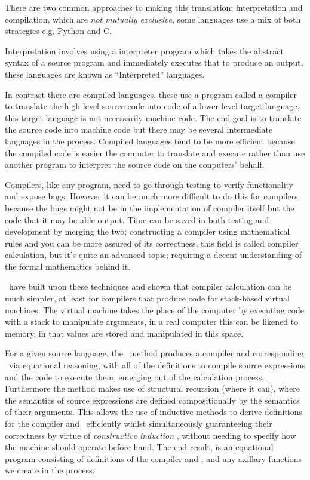 \documentclass {article}
\begin{document}
There are two common approaches to making this translation:
interpretation and compilation, which are \emph{not mutually exclusive}, some languages use a mix of both 
strategies e.g. Python and C.

Interpretation involves using a
interpreter program which takes the abstract syntax of a
source program and immediately executes that to produce an output,
these languages are known as ``Interpreted'' languages.

In contrast there are compiled languages, these use 
a program called a compiler to translate the high level
source code into code of a lower level target language,
this target language is not necessarily machine code.
The end goal is to translate the source code into machine code
but there may be several intermediate languages in the process\cite[pg 8-10]{compilers}. Compiled languages tend to be more efficient
because the compiled code is easier the computer to translate
and execute rather than use another program to interpret
the source code on the conputers' behalf.

Compilers, like any program, need to go through testing to
verify functionality and expose bugs. However it
can be much more difficult to do this for compilers
because the bugs might not be in the implementation of 
compiler itself but the code that it may be able output.
Time can be saved in both testing and development
by merging the two; constructing a compiler
using mathematical rules and you can be more
assured of its correctness, this field is called
compiler calculation\cite{meijer}, 
but it's quite an
advanced topic; requiring a decent understanding 
of the formal mathematics behind it.

\BH\ have built upon these techniques and shown that
compiler calculation can be much simpler,
at least for compilers that produce code
for stack-based virtual machines.
The virtual machine takes the place of the
computer by executing code with a stack
to manipulate arguments, in a real computer
this can be likened to memory, in that
values are stored and manipulated in this space.

For a given source language, 
the \BH\ method produces
a compiler and corresponding \vm\
via equational reasoning,
with all of the definitions 
to compile source expressions
and the code to execute them,
emerging out of the calculation process.
Furthermore the method makes
use of structural recursion (where it can),
where the semantics of source expressions are defined
compositionally by the semantics of their arguments.
This allows the use of inductive methods
to derive definitions for the compiler and \vm\ efficiently
whilst simultaneously guaranteeing their correctness by virtue 
of \emph{constructive induction} \cite{backhouse},
without needing to specify how the 
machine should operate before hand.
The end result, is an equational program consisting of
definitions of the compiler and \vm,
and any axillary functions we create in the process.
\end{document}
